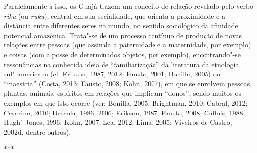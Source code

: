 Paralelamente a isso, os Guajá trazem um conceito de relação revelado
pelo verbo \emph{riku} (ou \emph{ruku}), central em sua socialidade, que
orienta a proximidade e a distância entre diferentes seres no mundo, no
sentido sociológico da afinidade potencial amazônica. Trata"-se de um
processo contínuo de produção de novas relações entre pessoas (que
assinala a paternidade e a maternidade, por exemplo) e coisas (com a
posse de determinados objetos, por exemplo), encontrando"-se ressonâncias
na conhecida ideia de ``familiarização'' da literatura da etnologia
sul"-americana (cf. Erikson, 1987, 2012; Fausto, 2001; Bonilla, 2005) ou
``maestria'' (Costa, 2013; Fausto, 2008; Kohn, 2007), em que se envolvem
pessoas, plantas, animais, espíritos em relações que implicam ``donos'',
sendo muitos os exemplos em que isto ocorre (ver: Bonilla, 2005;
Brightman, 2010; Cabral, 2012; Cesarino, 2010; Descola, 1986, 2006; Erikson,
1987; Fausto, 2008; Gallois, 1988; Hugh"-Jones, 1996; Kohn, 2007; Lea, 2012;
Lima, 2005; Viveiros de Castro, 2002d, dentre outros).

\begin{center}
***
\end{center}

